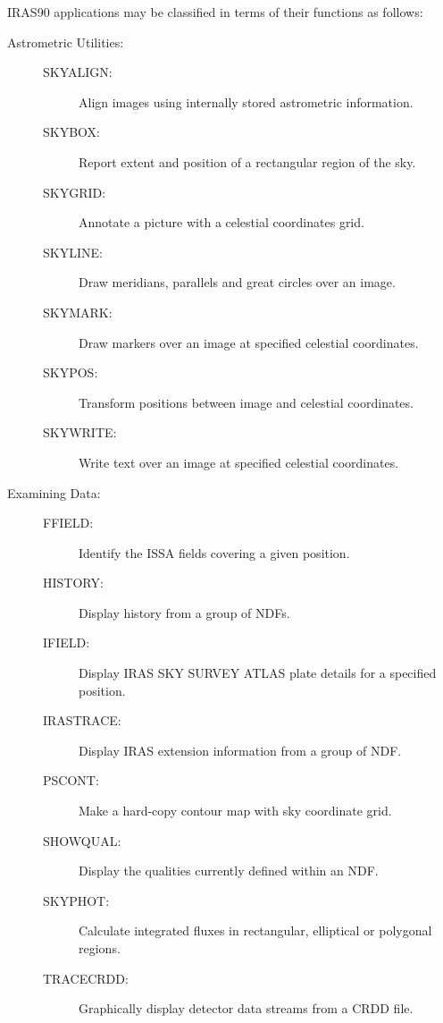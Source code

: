 \documentclass[11pt,nolof,noabs]{starlink}
\begin{document}
{\small IRAS90} applications may be classified in terms of their
functions as follows:
\begin{description}

\item [Astrometric Utilities:]
\mbox{}
\begin{description}
\item[SKYALIGN: ] Align images using internally stored astrometric
information.
\item[SKYBOX:   ] Report extent and position of a rectangular region of the
sky.
\item[SKYGRID:  ] Annotate a picture with a celestial coordinates grid.
\item[SKYLINE:  ] Draw meridians, parallels and great circles over an
image.
\item[SKYMARK:  ] Draw markers over an image at specified celestial
coordinates.
\item[SKYPOS:   ] Transform positions between image and celestial
coordinates.
\item[SKYWRITE: ] Write text over an image at specified celestial
coordinates.
\end{description}

\item [Examining Data:]
\mbox{}
\begin{description}
\item[FFIELD:   ] Identify the ISSA fields covering a given position.
\item[HISTORY:  ] Display history from a group of NDFs.
\item[IFIELD:   ] Display IRAS SKY SURVEY ATLAS plate details for a
specified position.
\item[IRASTRACE:] Display IRAS extension information from a group of NDF.
\item[PSCONT:   ] Make a hard-copy contour map with sky coordinate grid.
\item[SHOWQUAL: ] Display the qualities currently defined within an NDF.
\item[SKYPHOT:  ] Calculate integrated fluxes in rectangular, elliptical or
polygonal regions.
\item[TRACECRDD: ] Graphically display detector data streams from a CRDD
file.
\end{description}


\end{description}
\end{document}

